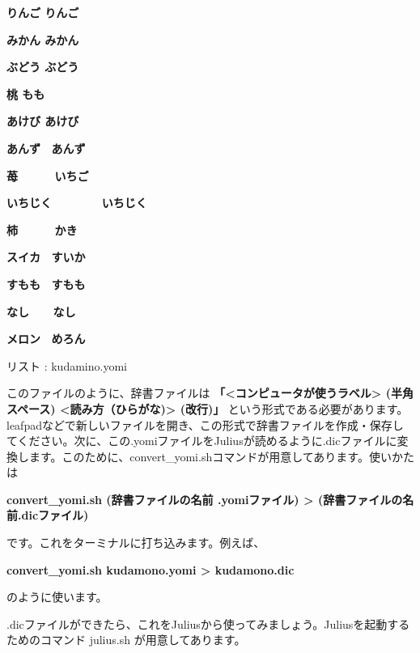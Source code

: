 \documentclass[a4paper,dvipdfmx]{jarticle}
\newcounter{List}
\renewcommand\theList{\arabic{List}}
\begin{document}
\centering
\begin{minipage}{17.006cm}
{\ttfamily\bfseries
りんご りんご}

{\ttfamily\bfseries
みかん みかん}

{\ttfamily\bfseries
ぶどう ぶどう}

{\ttfamily\bfseries
桃 もも}

{\ttfamily\bfseries
あけび あけび}

{\ttfamily\bfseries
あんず \ あんず}

{\ttfamily\bfseries
苺 \ \ \ \ \ いちご}

{\ttfamily\bfseries
いちじく \ \ \ \ \ \ \ いちじく}

{\ttfamily\bfseries
柿 \ \ \ \ \ かき}

{\ttfamily\bfseries
スイカ \ すいか}

{\ttfamily\bfseries
すもも \ すもも}

{\ttfamily\bfseries
なし \ \ \ なし}

{\ttfamily\bfseries
メロン \ めろん}

{\upshape
リスト \stepcounter{List}{\theList}: kudamino.yomi}
\end{minipage}
{
このファイルのように、辞書ファイルは\newline
\textbf{「{\textless}コンピュータが使うラベル{\textgreater}
(}\textbf{半角}\textbf{スペース)
{\textless}読み方（ひらがな){\textgreater} (改行)」}\newline
という形式である必要があります。leafpadなどで新しいファイルを開き、この形式で辞書ファイルを作成・保存してください。次に、この.yomiファイルをJuliusが読めるように.dicファイルに変換します。このために、convert\_yomi.shコマンドが用意してあります。使いかたは}

{\bfseries
convert\_yomi.sh (辞書ファイルの名前 .yomiファイル)
{\textgreater} (辞書ファイルの名前.dicファイル)}

{
です。これをターミナルに打ち込みます。例えば、}

{\ttfamily\bfseries
convert\_yomi.sh kudamono.yomi {\textgreater} kudamono.dic}

{
のように使います。}

{
.dicファイルができたら、これをJuliusから使ってみましょう。Juliusを起動するためのコマンド
julius.sh が用意してあります。}
\end{document}
